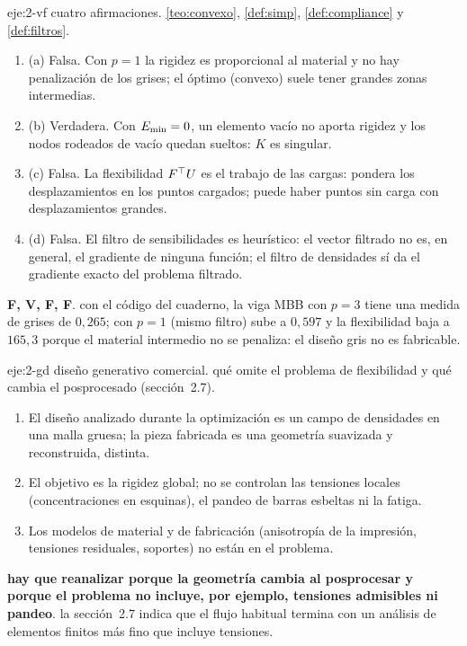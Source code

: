 \begin{solucion}{eje:2-vf}
\datos cuatro afirmaciones.
\planteamiento \cref{teo:convexo}, \cref{def:simp}, \cref{def:compliance} y \cref{def:filtros}.
\pasos
\begin{enumerate}[label=\arabic*.]
  \item (a) Falsa. Con $p=1$ la rigidez es proporcional al material y no hay penalización de los grises; el óptimo (convexo) suele tener grandes zonas intermedias.
  \item (b) Verdadera. Con $E_{\min}=0$, un elemento vacío no aporta rigidez y los nodos rodeados de vacío quedan sueltos: $K$ es singular.
  \item (c) Falsa. La flexibilidad $F^\top U$ es el trabajo de las cargas: pondera los desplazamientos en los puntos cargados; puede haber puntos sin carga con desplazamientos grandes.
  \item (d) Falsa. El filtro de sensibilidades es heurístico: el vector filtrado no es, en general, el gradiente de ninguna función; el filtro de densidades sí da el gradiente exacto del problema filtrado.
\end{enumerate}
\resultado \textbf{F, V, F, F}.
\comprobacion con el código del cuaderno, la viga MBB con $p=3$ tiene una medida de grises de $0{,}265$; con $p=1$ (mismo filtro) sube a $0{,}597$ y la flexibilidad baja a $165{,}3$ porque el material intermedio no se penaliza: el diseño gris no es fabricable.
\end{solucion}

\begin{solucion}{eje:2-gd}
\datos diseño generativo comercial.
\planteamiento qué omite el problema de flexibilidad y qué cambia el posprocesado (sección~2.7).
\pasos
\begin{enumerate}[label=\arabic*.]
  \item El diseño analizado durante la optimización es un campo de densidades en una malla gruesa; la pieza fabricada es una geometría suavizada y reconstruida, distinta.
  \item El objetivo es la rigidez global; no se controlan las tensiones locales (concentraciones en esquinas), el pandeo de barras esbeltas ni la fatiga.
  \item Los modelos de material y de fabricación (anisotropía de la impresión, tensiones residuales, soportes) no están en el problema.
\end{enumerate}
\resultado \textbf{hay que reanalizar porque la geometría cambia al posprocesar y porque el problema no incluye, por ejemplo, tensiones admisibles ni pandeo}.
\comprobacion la sección~2.7 indica que el flujo habitual termina con un análisis de elementos finitos más fino que incluye tensiones.
\end{solucion}

